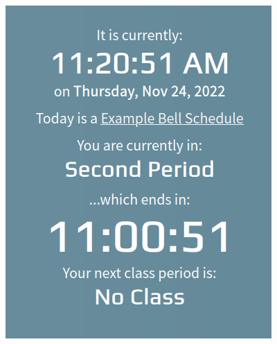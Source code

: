 \documentclass{article}
\begin{document}
\begin{enumerate}
\begin{center}
\includegraphics[width=3.9992in,height=4.9992in]{Mini20Manual-img002.png}
\end{center}
\end{enumerate}
\end{document}
